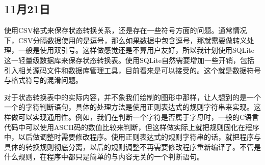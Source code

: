 \subsection{11月21日}
使用CSV格式来保存状态转换关系，还是存在一些符号方面的问题。通常情况下，CSV分隔数据使用的是逗号，那么如果数据中包含逗号，那就需要做转义处理，一般是使用双引号。这样做感觉还是不算用户友好，所以我计划使用SQLite这一轻量级数据库来保存状态转换表。使用SQLite自然需要增加一些开销，包括引入相关源码文件和数据库管理工具，目前看来是可以接受的。这个就是数据符号与格式符号的混淆问题。

对于状态转换表中的实际内容，并不象我们绘制的图形中那样，让人想到的是一个一个的字符判断语句，具体的处理方法是使用正则表达式的规则字符串来实现。这样做可以实现通用性。例如，我们在判断一个字符是否属于字母时，一般的C语言代码中可以使用ASCII码的数值比较来判断，但这样做实际上就把规则固化在程序中，以后做调整时需要修改程序。使用正则表达式的规则字符串的话，就把程序与具体的转换规则彻底分离，以后的规则调整不再需要修改程序重新编译了。不管是什么规则，在程序中都只是简单的与内容无关的一个判断语句。